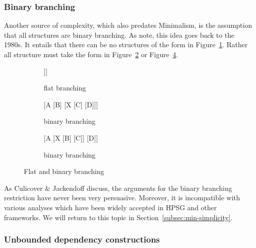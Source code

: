 \documentclass[output=paper,biblatex,babelshorthands,newtxmath,draftmode,colorlinks,citecolor=brown]{langscibook}
\begin{document}
\subsubsection{Binary branching}

\largerpage
Another source of complexity, which also predates Minimalism, is the assumption that
all structures are binary branching. As  \citet[112--116]{CJ2005a} note, this idea goes back to the
1980s. It entails that there can be no structures of the form in
Figure~\ref{fig:min-trinary}. Rather all structure must take the form in
Figure~\ref{fig:min-binary-a} or Figure~\ref{fig:min-binary-b}.
\begin{figure}
\hfill
\begin{subfigure}[t]{0.3\textwidth}
\centering
	\begin{forest} %
		[A
		[B][C][D [\vphantom{E},no edge]]]
	\end{forest}
\vfill
	\caption{\label{fig:min-trinary}flat branching}
\end{subfigure}
\hfill
\begin{subfigure}[t]{0.3\textwidth}
\centering
	\begin{forest} %
		[A
		  [B]
		  [X 
                    [C] 
                    [D]]]
	\end{forest}
	\caption{\label{fig:min-binary-a}binary branching}
\end{subfigure}
\hfill
\begin{subfigure}[t]{0.3\textwidth}
\centering
	\begin{forest} %
		[A
		  [X 
                    [B]
                    [C]]
		  [D]]
	\end{forest}
	\caption{\label{fig:min-binary-b}binary branching}
\end{subfigure}
\hfill\mbox{}
\caption{Flat and binary branching}
\end{figure}
%
As Culicover \& Jackendoff discuss, the arguments for the binary branching restriction have never
been very persuasive. Moreover, it is incompatible with various analyses which have been widely
accepted in HPSG and other frameworks. We will return to this topic in
Section~\ref{subsec:min-simplicity}. 


\subsubsection{Unbounded dependency constructions}
\label{minimalism-sec-empty-elements-for-relative-clauses}
\end{document}
